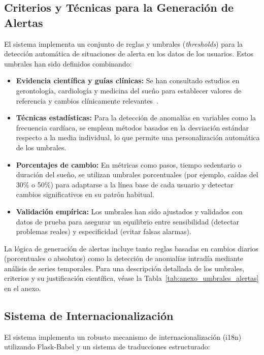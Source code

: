 \subsection{Criterios y Técnicas para la Generación de Alertas}
El sistema implementa un conjunto de reglas y umbrales (\textit{thresholds}) para la detección automática de situaciones de alerta en los datos de los usuarios. Estos umbrales han sido definidos combinando:

\begin{itemize}
    \item \textbf{Evidencia científica y guías clínicas:} Se han consultado estudios en gerontología, cardiología y medicina del sueño para establecer valores de referencia y cambios clínicamente relevantes~\cite{Smith2019, Owen2020, Irwin2015}.
    \item \textbf{Técnicas estadísticas:} Para la detección de anomalías en variables como la frecuencia cardíaca, se emplean métodos basados en la desviación estándar respecto a la media individual, lo que permite una personalización automática de los umbrales.
    \item \textbf{Porcentajes de cambio:} En métricas como pasos, tiempo sedentario o duración del sueño, se utilizan umbrales porcentuales (por ejemplo, caídas del 30\% o 50\%) para adaptarse a la línea base de cada usuario y detectar cambios significativos en su patrón habitual.
    \item \textbf{Validación empírica:} Los umbrales han sido ajustados y validados con datos de prueba para asegurar un equilibrio entre sensibilidad (detectar problemas reales) y especificidad (evitar falsas alarmas).
\end{itemize}

La lógica de generación de alertas incluye tanto reglas basadas en cambios diarios (porcentuales o absolutos) como la detección de anomalías intradía mediante análisis de series temporales. Para una descripción detallada de los umbrales, criterios y su justificación científica, véase la Tabla~\ref{tab:anexo_umbrales_alertas} en el anexo.

\subsection{Sistema de Internacionalización}
\label{subsec:impl_i18n}

El sistema implementa un robusto mecanismo de internacionalización (i18n) utilizando Flask-Babel y un sistema de traducciones estructurado:

